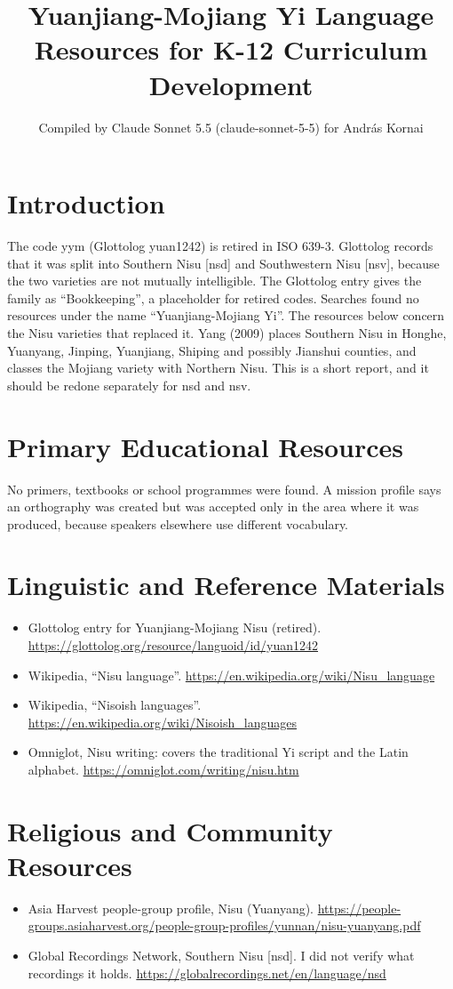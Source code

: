 \documentclass[12pt]{article}
\title{Yuanjiang-Mojiang Yi Language Resources for K-12 Curriculum Development}
\author{Compiled by Claude Sonnet 5.5 (claude-sonnet-5-5) for Andr\'as Kornai}
\date{}
\begin{document}
\maketitle

\section{Introduction}
The code yym (Glottolog yuan1242) is retired in ISO 639-3. Glottolog records that it was split into Southern Nisu [nsd] and Southwestern Nisu [nsv], because the two varieties are not mutually intelligible. The Glottolog entry gives the family as ``Bookkeeping'', a placeholder for retired codes. Searches found no resources under the name ``Yuanjiang-Mojiang Yi''. The resources below concern the Nisu varieties that replaced it. Yang (2009) places Southern Nisu in Honghe, Yuanyang, Jinping, Yuanjiang, Shiping and possibly Jianshui counties, and classes the Mojiang variety with Northern Nisu. This is a short report, and it should be redone separately for nsd and nsv.

\section{Primary Educational Resources}
No primers, textbooks or school programmes were found. A mission profile says an orthography was created but was accepted only in the area where it was produced, because speakers elsewhere use different vocabulary.

\section{Linguistic and Reference Materials}
\begin{itemize}
\item Glottolog entry for Yuanjiang-Mojiang Nisu (retired). \url{https://glottolog.org/resource/languoid/id/yuan1242}
\item Wikipedia, ``Nisu language''. \url{https://en.wikipedia.org/wiki/Nisu_language}
\item Wikipedia, ``Nisoish languages''. \url{https://en.wikipedia.org/wiki/Nisoish_languages}
\item Omniglot, Nisu writing: covers the traditional Yi script and the Latin alphabet. \url{https://omniglot.com/writing/nisu.htm}
\end{itemize}

\section{Religious and Community Resources}
\begin{itemize}
\item Asia Harvest people-group profile, Nisu (Yuanyang). \url{https://people-groups.asiaharvest.org/people-group-profiles/yunnan/nisu-yuanyang.pdf}
\item Global Recordings Network, Southern Nisu [nsd]. I did not verify what recordings it holds. \url{https://globalrecordings.net/en/language/nsd}
\end{itemize}
\end{document}
